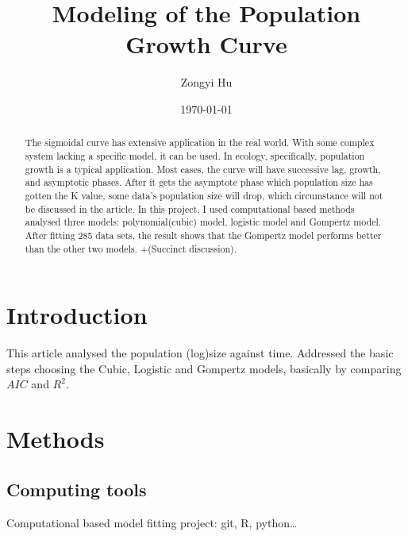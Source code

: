 \documentclass[11pt, a4paper]{article}
\title{Modeling of the Population Growth Curve}
\author{Zongyi Hu}
\date{\small \today}
\begin{document}

\maketitle %

\begin{abstract}
    The sigmoidal curve has extensive application in the real world. With some complex system lacking a specific model, it can be used\cite{gibbs2000variational}. In ecology, specifically, population growth is a typical application. Most cases, the curve will have successive lag, growth, and asymptotic phases. After it gets the asymptote phase which population size has gotten the K value, some data’s population size will drop, which circumstance will not be discussed in the article. In this project, I used computational based methods analysed three models: polynomial(cubic) model, logistic model and Gompertz model. After fitting 285 data sets, the result shows that the Gompertz model performs better than the other two models. +(Succinct discussion).
\end{abstract}


\section{Introduction}
  This article analysed the population (log)size against time. Addressed the basic steps choosing the Cubic, Logistic and Gompertz models\cite{zwietering1990modeling}, basically by comparing $AIC$ and $R^2$.
  
  
\section{Methods}
\subsection{Computing tools}
Computational based model fitting project: git, R, python…
\end{document}
